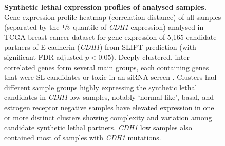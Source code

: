 \begin{figure}[!ht]
\begin{mdframed}
  \centering
    \caption[Synthetic lethal expression profiles of analysed samples]{\small \textbf{Synthetic lethal expression profiles of analysed samples.} Gene expression profile heatmap (correlation distance) of all samples (separated by the $\sfrac{1}{3}$ quantile of \textit{CDH1} expression) analysed in TCGA breast cancer dataset for gene expression of 5,165 candidate partners of E-cadherin (\textit{CDH1}) from SLIPT prediction (with significant FDR adjusted $p < 0.05$). Deeply clustered, inter-correlated genes form several main groups, each containing genes that were SL candidates or toxic in an siRNA screen \cite{Telford2015}. Clusters had different sample groups highly expressing the synthetic lethal candidates in \textit{CDH1} low samples, notably `normal-like', basal, and estrogen receptor negative samples have elevated expression in one or more distinct clusters showing complexity and variation among candidate synthetic lethal partners. \textit{CDH1} low samples also contained most of samples with \textit{CDH1} mutations.
}
\label{fig:slipt_expr}
\end{mdframed}
\end{figure}


